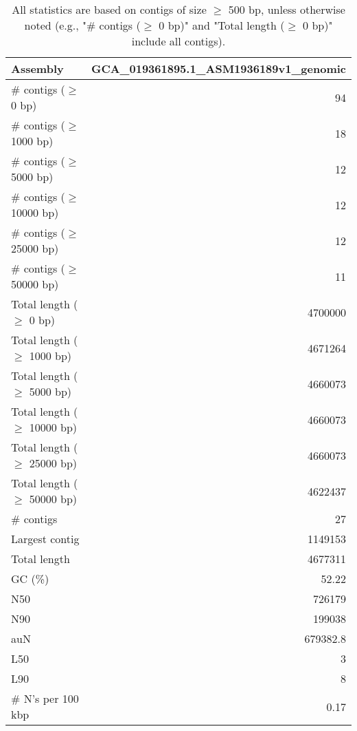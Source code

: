 \documentclass[12pt,a4paper]{article}
\begin{document}
\begin{table}[ht]
\begin{center}
\caption{All statistics are based on contigs of size $\geq$ 500 bp, unless otherwise noted (e.g., "\# contigs ($\geq$ 0 bp)" and "Total length ($\geq$ 0 bp)" include all contigs).}
\begin{tabular}{|l*{1}{|r}|}
\hline
Assembly & GCA\_019361895.1\_ASM1936189v1\_genomic \\ \hline
\# contigs ($\geq$ 0 bp) & 94 \\ \hline
\# contigs ($\geq$ 1000 bp) & 18 \\ \hline
\# contigs ($\geq$ 5000 bp) & 12 \\ \hline
\# contigs ($\geq$ 10000 bp) & 12 \\ \hline
\# contigs ($\geq$ 25000 bp) & 12 \\ \hline
\# contigs ($\geq$ 50000 bp) & 11 \\ \hline
Total length ($\geq$ 0 bp) & 4700000 \\ \hline
Total length ($\geq$ 1000 bp) & 4671264 \\ \hline
Total length ($\geq$ 5000 bp) & 4660073 \\ \hline
Total length ($\geq$ 10000 bp) & 4660073 \\ \hline
Total length ($\geq$ 25000 bp) & 4660073 \\ \hline
Total length ($\geq$ 50000 bp) & 4622437 \\ \hline
\# contigs & 27 \\ \hline
Largest contig & 1149153 \\ \hline
Total length & 4677311 \\ \hline
GC (\%) & 52.22 \\ \hline
N50 & 726179 \\ \hline
N90 & 199038 \\ \hline
auN & 679382.8 \\ \hline
L50 & 3 \\ \hline
L90 & 8 \\ \hline
\# N's per 100 kbp & 0.17 \\ \hline
\end{tabular}
\end{center}
\end{table}
\end{document}
